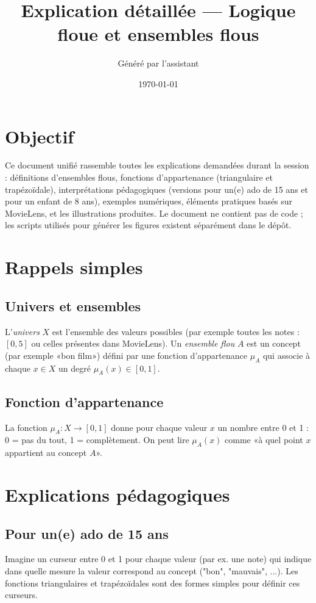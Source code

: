 \documentclass[a4paper,11pt]{article}
\title{Explication détaillée — Logique floue et ensembles flous}
\author{Généré par l'assistant}
\date{\today}
\begin{document}
\maketitle

\section*{Objectif}
Ce document unifié rassemble toutes les explications demandées durant la session : définitions d'ensembles flous, fonctions d'appartenance (triangulaire et trapézoïdale), interprétations pédagogiques (versions pour un(e) ado de 15 ans et pour un enfant de 8 ans), exemples numériques, éléments pratiques basés sur MovieLens, et les illustrations produites. Le document ne contient pas de code ; les scripts utilisés pour générer les figures existent séparément dans le dépôt.

\section{Rappels simples}
\subsection{Univers et ensembles}
L'\emph{univers} $X$ est l'ensemble des valeurs possibles (par exemple toutes les notes : $[0,5]$ ou celles présentes dans MovieLens). Un \emph{ensemble flou} $A$ est un concept (par exemple «bon film») défini par une fonction d'appartenance $\mu_A$ qui associe à chaque $x\in X$ un degré $\mu_A(x)\in[0,1]$.

\subsection{Fonction d'appartenance}
La fonction $\mu_A:X\to[0,1]$ donne pour chaque valeur $x$ un nombre entre 0 et 1 : 0 = pas du tout, 1 = complètement. On peut lire $\mu_A(x)$ comme «à quel point $x$ appartient au concept $A$».

\section{Explications pédagogiques}
\subsection*{Pour un(e) ado de 15 ans}
Imagine un curseur entre 0 et 1 pour chaque valeur (par ex. une note) qui indique dans quelle mesure la valeur correspond au concept ("bon", "mauvais", ...). Les fonctions triangulaires et trapézoïdales sont des formes simples pour définir ces curseurs.
\end{document}
